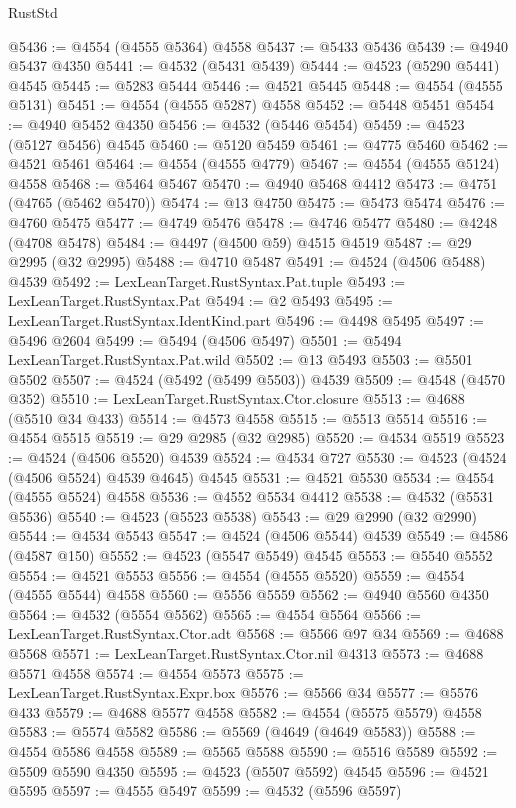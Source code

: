 \begin{lexlean}{RustStd}
\begin{coremodule}
@5436 := @4554 (@4555 @5364) @4558
@5437 := @5433 @5436
@5439 := @4940 @5437 @4350
@5441 := @4532 (@5431 @5439)
@5444 := @4523 (@5290 @5441) @4545
@5445 := @5283 @5444
@5446 := @4521 @5445
@5448 := @4554 (@4555 @5131)
@5451 := @4554 (@4555 @5287) @4558
@5452 := @5448 @5451
@5454 := @4940 @5452 @4350
@5456 := @4532 (@5446 @5454)
@5459 := @4523 (@5127 @5456) @4545
@5460 := @5120 @5459
@5461 := @4775 @5460
@5462 := @4521 @5461
@5464 := @4554 (@4555 @4779)
@5467 := @4554 (@4555 @5124) @4558
@5468 := @5464 @5467
@5470 := @4940 @5468 @4412
@5473 := @4751 (@4765 (@5462 @5470))
@5474 := @13 @4750
@5475 := @5473 @5474
@5476 := @4760 @5475
@5477 := @4749 @5476
@5478 := @4746 @5477
@5480 := @4248 (@4708 @5478)
@5484 := @4497 (@4500 @59) @4515 @4519
@5487 := @29 @2995 (@32 @2995)
@5488 := @4710 @5487
@5491 := @4524 (@4506 @5488) @4539
@5492 := LexLeanTarget.RustSyntax.Pat.tuple
@5493 := LexLeanTarget.RustSyntax.Pat
@5494 := @2 @5493
@5495 := LexLeanTarget.RustSyntax.IdentKind.part
@5496 := @4498 @5495
@5497 := @5496 @2604
@5499 := @5494 (@4506 @5497)
@5501 := @5494 LexLeanTarget.RustSyntax.Pat.wild
@5502 := @13 @5493
@5503 := @5501 @5502
@5507 := @4524 (@5492 (@5499 @5503)) @4539
@5509 := @4548 (@4570 @352)
@5510 := LexLeanTarget.RustSyntax.Ctor.closure
@5513 := @4688 (@5510 @34 @433)
@5514 := @4573 @4558
@5515 := @5513 @5514
@5516 := @4554 @5515
@5519 := @29 @2985 (@32 @2985)
@5520 := @4534 @5519
@5523 := @4524 (@4506 @5520) @4539
@5524 := @4534 @727
@5530 := @4523 (@4524 (@4506 @5524) @4539 @4645) @4545
@5531 := @4521 @5530
@5534 := @4554 (@4555 @5524) @4558
@5536 := @4552 @5534 @4412
@5538 := @4532 (@5531 @5536)
@5540 := @4523 (@5523 @5538)
@5543 := @29 @2990 (@32 @2990)
@5544 := @4534 @5543
@5547 := @4524 (@4506 @5544) @4539
@5549 := @4586 (@4587 @150)
@5552 := @4523 (@5547 @5549) @4545
@5553 := @5540 @5552
@5554 := @4521 @5553
@5556 := @4554 (@4555 @5520)
@5559 := @4554 (@4555 @5544) @4558
@5560 := @5556 @5559
@5562 := @4940 @5560 @4350
@5564 := @4532 (@5554 @5562)
@5565 := @4554 @5564
@5566 := LexLeanTarget.RustSyntax.Ctor.adt
@5568 := @5566 @97 @34
@5569 := @4688 @5568
@5571 := LexLeanTarget.RustSyntax.Ctor.nil @4313
@5573 := @4688 @5571 @4558
@5574 := @4554 @5573
@5575 := LexLeanTarget.RustSyntax.Expr.box
@5576 := @5566 @34
@5577 := @5576 @433
@5579 := @4688 @5577 @4558
@5582 := @4554 (@5575 @5579) @4558
@5583 := @5574 @5582
@5586 := @5569 (@4649 (@4649 @5583))
@5588 := @4554 @5586 @4558
@5589 := @5565 @5588
@5590 := @5516 @5589
@5592 := @5509 @5590 @4350
@5595 := @4523 (@5507 @5592) @4545
@5596 := @4521 @5595
@5597 := @4555 @5497
@5599 := @4532 (@5596 @5597)

\end{coremodule}
\end{lexlean}
